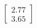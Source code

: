 \documentclass[preview]{standalone}
\begin{document}
\begin{align*}
\begin{bmatrix} 2.77 \\ 3.65 \end{bmatrix}
\end{align*}
\end{document}
